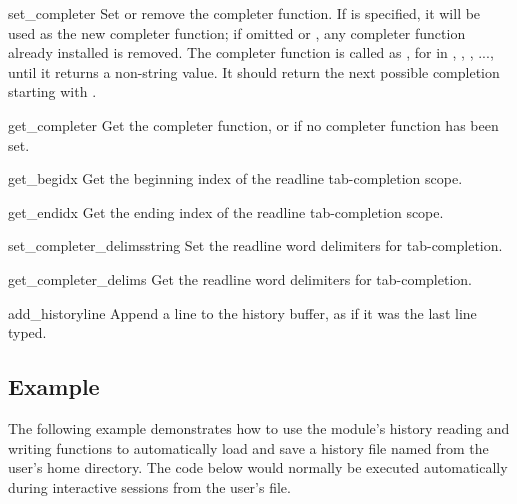 \begin{funcdesc}{set_completer}{}
Set or remove the completer function.  If  is specified,
it will be used as the new completer function; if omitted or
, any completer function already installed is removed.  The
completer function is called as , for  in , , , ...,
until it returns a non-string value.  It should return the next
possible completion starting with .
\end{funcdesc}

\begin{funcdesc}{get_completer}{}
Get the completer function, or  if no completer function
has been set.  
\end{funcdesc}

\begin{funcdesc}{get_begidx}{}
Get the beginning index of the readline tab-completion scope.
\end{funcdesc}

\begin{funcdesc}{get_endidx}{}
Get the ending index of the readline tab-completion scope.
\end{funcdesc}

\begin{funcdesc}{set_completer_delims}{string}
Set the readline word delimiters for tab-completion.
\end{funcdesc}

\begin{funcdesc}{get_completer_delims}{}
Get the readline word delimiters for tab-completion.
\end{funcdesc}

\begin{funcdesc}{add_history}{line}
Append a line to the history buffer, as if it was the last line typed.
\end{funcdesc}


\begin{seealso}
\end{seealso}


\subsection{Example \label{readline-example}}

The following example demonstrates how to use the
 module's history reading and writing functions to
automatically load and save a history file named  from
the user's home directory.  The code below would normally be executed
automatically during interactive sessions from the user's
 file.

